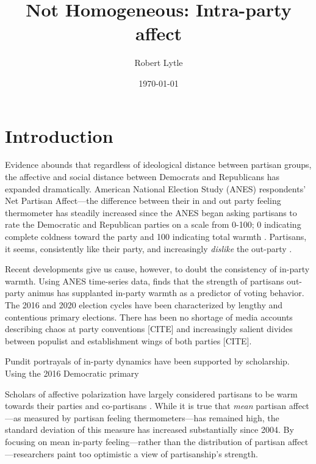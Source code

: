 \documentclass[12pt]{article}
\begin{document}
\title{Not Homogeneous: Intra-party affect}
\author{Robert Lytle}
\date{\today}
\maketitle
\thispagestyle{empty}
\clearpage
\section{Introduction}
Evidence abounds that regardless of ideological distance between partisan groups, the affective and social distance between Democrats and Republicans has expanded dramatically. American National Election Study (ANES) respondents' Net Partisan Affect---the difference between their in and out party feeling thermometer has steadily increased since the ANES began asking partisans to rate the Democratic and Republican parties on a scale from 0-100; 0 indicating complete coldness toward the party and 100 indicating total warmth . Partisans, it seems, consistently like their party, and increasingly \textit{dislike} the out-party \citep{iyengar2012affect}.

Recent developments give us cause, however, to doubt the consistency of in-party warmth. Using ANES time-series data, \cite{iyengar2018strengthening} finds that the strength of partisans out-party animus has supplanted in-party warmth as a predictor of voting behavior. The 2016 and 2020 election cycles have been characterized by lengthy and contentious primary elections. There has been no shortage of media accounts describing chaos at party conventions [CITE] and increasingly salient divides between populist and establishment wings of both parties [CITE].

 Pundit portrayals of in-party dynamics have been supported by scholarship.
Using the 2016 Democratic primary \cite{wronski2018tale}


Scholars of affective polarization have largely considered partisans to be warm towards their parties and co-partisans \citep{iyengar2012affect, iyengar2018strengthening, abramowitz2010disappearing}. While it is true that \textit{mean} partisan affect---as measured by partisan feeling thermometers---has remained high, the standard deviation of this measure has increased substantially since 2004. By focusing on mean in-party feeling---rather than the distribution of partisan affect---researchers paint too optimistic a view of partisanship's strength. 
\end{document}
